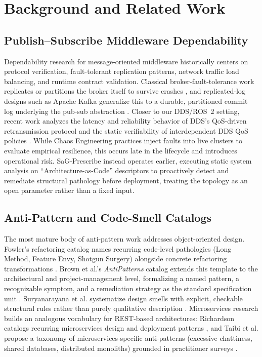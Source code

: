 \documentclass[11pt]{article}
\begin{document}
\section{Background and Related Work}

\subsection{Publish--Subscribe Middleware Dependability}

Dependability research for message-oriented middleware historically centers on protocol verification,
fault-tolerant replication patterns, network traffic load balancing, and runtime contract validation.
Classical broker-fault-tolerance work replicates or partitions the broker itself to survive crashes
\cite{Pallickara2007,Chang2014}, and replicated-log designs such as Apache Kafka generalize this to a
durable, partitioned commit log underlying the pub-sub abstraction \cite{Wang2015}. Closer to our
DDS/ROS~2 setting, recent work analyzes the latency and reliability behavior of DDS's QoS-driven
retransmission protocol \cite{Lee2025Latency} and the static verifiability of interdependent DDS QoS
policies \cite{Lee2025QoS}. While Chaos Engineering practices inject faults into live clusters to
evaluate empirical resilience, this occurs late in the lifecycle and introduces operational risk.
SaG-Prescribe instead operates earlier, executing static system analysis on ``Architecture-as-Code''
descriptors to proactively detect and remediate structural pathology before deployment, treating the
topology as an open parameter rather than a fixed input.

\subsection{Anti-Pattern and Code-Smell Catalogs}

The most mature body of anti-pattern work addresses object-oriented design. Fowler's refactoring
catalog names recurring code-level pathologies (Long Method, Feature Envy, Shotgun Surgery) alongside
concrete refactoring transformations \cite{Fowler1999}. Brown et al.'s \emph{AntiPatterns} catalog
extends this template to the architectural and project-management level, formalizing a named pattern,
a recognizable symptom, and a remediation strategy as the standard specification unit
\cite{Brown1998}. Suryanarayana et al. systematize design smells with explicit, checkable structural
rules rather than purely qualitative description \cite{Suryanarayana2014}. Microservices research
builds an analogous vocabulary for REST-based architectures: Richardson catalogs recurring
microservices design and deployment patterns \cite{Richardson2018}, and Taibi et al. propose a taxonomy
of microservices-specific anti-patterns (excessive chattiness, shared databases, distributed
monoliths) grounded in practitioner surveys \cite{Taibi2020}.
\end{document}
